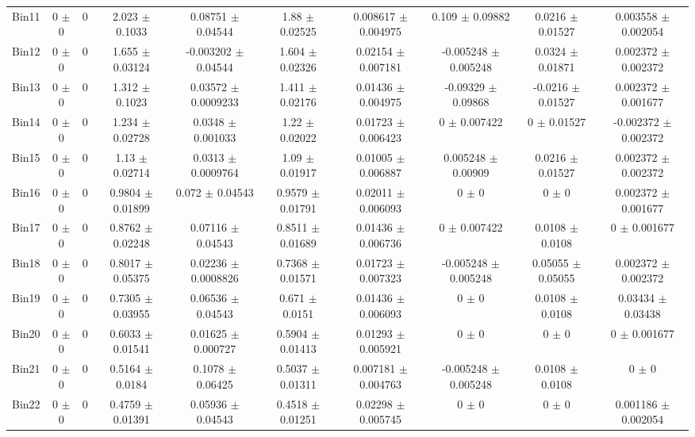 \begin{tabular}{@{\extracolsep{4pt}}lccccccccc@{}}
     Bin11 & 0 $\pm$ 0 & 0 & 2.023 $\pm$ 0.1033 & 0.08751 $\pm$ 0.04544 & 1.88 $\pm$ 0.02525 & 0.008617 $\pm$ 0.004975 & 0.109 $\pm$ 0.09882 & 0.0216 $\pm$ 0.01527 & 0.003558 $\pm$ 0.002054 \\ 
     Bin12 & 0 $\pm$ 0 & 0 & 1.655 $\pm$ 0.03124 & -0.003202 $\pm$ 0.04544 & 1.604 $\pm$ 0.02326 & 0.02154 $\pm$ 0.007181 & -0.005248 $\pm$ 0.005248 & 0.0324 $\pm$ 0.01871 & 0.002372 $\pm$ 0.002372 \\ 
     Bin13 & 0 $\pm$ 0 & 0 & 1.312 $\pm$ 0.1023 & 0.03572 $\pm$ 0.0009233 & 1.411 $\pm$ 0.02176 & 0.01436 $\pm$ 0.004975 & -0.09329 $\pm$ 0.09868 & -0.0216 $\pm$ 0.01527 & 0.002372 $\pm$ 0.001677 \\ 
     Bin14 & 0 $\pm$ 0 & 0 & 1.234 $\pm$ 0.02728 & 0.0348 $\pm$ 0.001033 & 1.22 $\pm$ 0.02022 & 0.01723 $\pm$ 0.006423 & 0 $\pm$ 0.007422 & 0 $\pm$ 0.01527 & -0.002372 $\pm$ 0.002372 \\ 
     Bin15 & 0 $\pm$ 0 & 0 & 1.13 $\pm$ 0.02714 & 0.0313 $\pm$ 0.0009764 & 1.09 $\pm$ 0.01917 & 0.01005 $\pm$ 0.006887 & 0.005248 $\pm$ 0.00909 & 0.0216 $\pm$ 0.01527 & 0.002372 $\pm$ 0.002372 \\ 
     Bin16 & 0 $\pm$ 0 & 0 & 0.9804 $\pm$ 0.01899 & 0.072 $\pm$ 0.04543 & 0.9579 $\pm$ 0.01791 & 0.02011 $\pm$ 0.006093 & 0 $\pm$ 0 & 0 $\pm$ 0 & 0.002372 $\pm$ 0.001677 \\ 
     Bin17 & 0 $\pm$ 0 & 0 & 0.8762 $\pm$ 0.02248 & 0.07116 $\pm$ 0.04543 & 0.8511 $\pm$ 0.01689 & 0.01436 $\pm$ 0.006736 & 0 $\pm$ 0.007422 & 0.0108 $\pm$ 0.0108 & 0 $\pm$ 0.001677 \\ 
     Bin18 & 0 $\pm$ 0 & 0 & 0.8017 $\pm$ 0.05375 & 0.02236 $\pm$ 0.0008826 & 0.7368 $\pm$ 0.01571 & 0.01723 $\pm$ 0.007323 & -0.005248 $\pm$ 0.005248 & 0.05055 $\pm$ 0.05055 & 0.002372 $\pm$ 0.002372 \\ 
     Bin19 & 0 $\pm$ 0 & 0 & 0.7305 $\pm$ 0.03955 & 0.06536 $\pm$ 0.04543 & 0.671 $\pm$ 0.0151 & 0.01436 $\pm$ 0.006093 & 0 $\pm$ 0 & 0.0108 $\pm$ 0.0108 & 0.03434 $\pm$ 0.03438 \\ 
     Bin20 & 0 $\pm$ 0 & 0 & 0.6033 $\pm$ 0.01541 & 0.01625 $\pm$ 0.000727 & 0.5904 $\pm$ 0.01413 & 0.01293 $\pm$ 0.005921 & 0 $\pm$ 0 & 0 $\pm$ 0 & 0 $\pm$ 0.001677 \\ 
     Bin21 & 0 $\pm$ 0 & 0 & 0.5164 $\pm$ 0.0184 & 0.1078 $\pm$ 0.06425 & 0.5037 $\pm$ 0.01311 & 0.007181 $\pm$ 0.004763 & -0.005248 $\pm$ 0.005248 & 0.0108 $\pm$ 0.0108 & 0 $\pm$ 0 \\ 
     Bin22 & 0 $\pm$ 0 & 0 & 0.4759 $\pm$ 0.01391 & 0.05936 $\pm$ 0.04543 & 0.4518 $\pm$ 0.01251 & 0.02298 $\pm$ 0.005745 & 0 $\pm$ 0 & 0 $\pm$ 0 & 0.001186 $\pm$ 0.002054 \\ 

\end{tabular}

